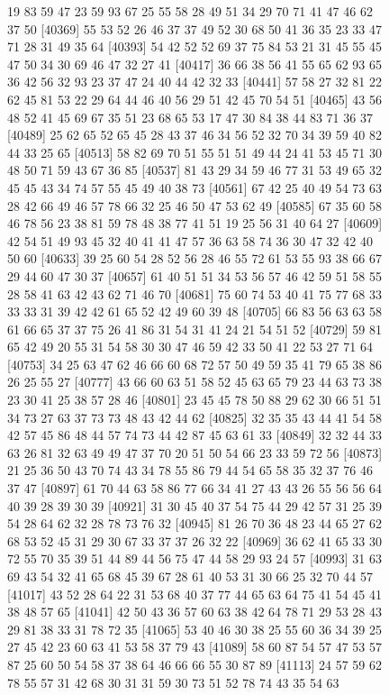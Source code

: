 \documentclass{article}
\begin{document}
\begin{figure}[H]
\begin{Schunk}
\begin{Soutput}
[40345] 19 83 59 47 23 59 93 67 25 55 58 28 49 51 34 29 70 71 41 47 46 62 37 50
[40369] 55 53 52 26 46 37 37 49 52 30 68 50 41 36 35 23 33 47 71 28 31 49 35 64
[40393] 54 42 52 52 69 37 75 84 53 21 31 45 55 45 47 50 34 30 69 46 47 32 27 41
[40417] 36 66 38 56 41 55 65 62 93 65 36 42 56 32 93 23 37 47 24 40 44 42 32 33
[40441] 57 58 27 32 81 22 62 45 81 53 22 29 64 44 46 40 56 29 51 42 45 70 54 51
[40465] 43 56 48 52 41 45 69 67 35 51 23 68 65 53 17 47 30 84 38 44 83 71 36 37
[40489] 25 62 65 52 65 45 28 43 37 46 34 56 52 32 70 34 39 59 40 82 44 33 25 65
[40513] 58 82 69 70 51 55 51 51 49 44 24 41 53 45 71 30 48 50 71 59 43 67 36 85
[40537] 81 43 29 34 59 46 77 31 53 49 65 32 45 45 43 34 74 57 55 45 49 40 38 73
[40561] 67 42 25 40 49 54 73 63 28 42 66 49 46 57 78 66 32 25 46 50 47 53 62 49
[40585] 67 35 60 58 46 78 56 23 38 81 59 78 48 38 77 41 51 19 25 56 31 40 64 27
[40609] 42 54 51 49 93 45 32 40 41 41 47 57 36 63 58 74 36 30 47 32 42 40 50 60
[40633] 39 25 60 54 28 52 56 28 46 55 72 61 53 55 93 38 66 67 29 44 60 47 30 37
[40657] 61 40 51 51 34 53 56 57 46 42 59 51 58 55 28 58 41 63 42 43 62 71 46 70
[40681] 75 60 74 53 40 41 75 77 68 33 33 33 31 39 42 42 61 65 52 42 49 60 39 48
[40705] 66 83 56 63 63 58 61 66 65 37 37 75 26 41 86 31 54 31 41 24 21 54 51 52
[40729] 59 81 65 42 49 20 55 31 54 58 30 30 47 46 59 42 33 50 41 22 53 27 71 64
[40753] 34 25 63 47 62 46 66 60 68 72 57 50 49 59 35 41 79 65 38 86 26 25 55 27
[40777] 43 66 60 63 51 58 52 45 63 65 79 23 44 63 73 38 23 30 41 25 38 57 28 46
[40801] 23 45 45 78 50 88 29 62 30 66 51 51 34 73 27 63 37 73 73 48 43 42 44 62
[40825] 32 35 35 43 44 41 54 58 42 57 45 86 48 44 57 74 73 44 42 87 45 63 61 33
[40849] 32 32 44 33 63 26 81 32 63 49 49 47 37 70 20 51 50 54 66 23 33 59 72 56
[40873] 21 25 36 50 43 70 74 43 34 78 55 86 79 44 54 65 58 35 32 37 76 46 37 47
[40897] 61 70 44 63 58 86 77 66 34 41 27 43 43 26 55 56 56 64 40 39 28 39 30 39
[40921] 31 30 45 40 37 54 75 44 29 42 57 31 25 39 54 28 64 62 32 28 78 73 76 32
[40945] 81 26 70 36 48 23 44 65 27 62 68 53 52 45 31 29 30 67 33 37 37 26 32 22
[40969] 36 62 41 65 33 30 72 55 70 35 39 51 44 89 44 56 75 47 44 58 29 93 24 57
[40993] 31 63 69 43 54 32 41 65 68 45 39 67 28 61 40 53 31 30 66 25 32 70 44 57
[41017] 43 52 28 64 22 31 53 68 40 37 77 44 65 63 64 75 41 54 45 41 38 48 57 65
[41041] 42 50 43 36 57 60 63 38 42 64 78 71 29 53 28 43 29 81 38 33 31 78 72 35
[41065] 53 40 46 30 38 25 55 60 36 34 39 25 27 45 42 23 60 63 41 53 58 37 79 43
[41089] 58 60 87 54 57 47 53 57 87 25 60 50 54 58 37 38 64 46 66 66 55 30 87 89
[41113] 24 57 59 62 78 55 57 31 42 68 30 31 31 59 30 73 51 52 78 74 43 35 54 63

\end{Soutput}
\end{Schunk}
\end{figure}
\end{document}
